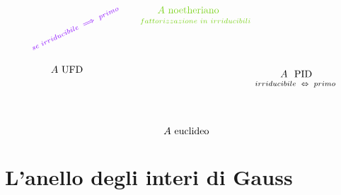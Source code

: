 \begin{equation*}
\begin{tikzpicture}[x=0.75pt,y=0.75pt,yscale=-1,xscale=1]
\draw (273.6,34.4) node [anchor=north west][inner sep=0.75pt]  [color={rgb, 255:red, 126; green, 211; blue, 33 }  ,opacity=1 ] [align=left] {$\displaystyle A$ {noetheriano}};
\draw (439,121) node [anchor=north west][inner sep=0.75pt]   [align=left] {$\displaystyle A\ $ {PID}};
\draw (130,115) node [anchor=north west][inner sep=0.75pt]   [align=left] {$\displaystyle A$ {UFD}};
\draw (282,198) node [anchor=north west][inner sep=0.75pt]   [align=left] {$\displaystyle A$ {euclideo}};
\draw (405,135.4) node [anchor=north west][inner sep=0.75pt]  [font=\scriptsize]  {$irriducibile\ \Leftrightarrow \ primo$};
\draw (102.65,88.7) node [anchor=north west][inner sep=0.75pt]  [font=\scriptsize,color={rgb, 255:red, 74; green, 144; blue, 226 }  ,opacity=1 ,rotate=-334.88]  {$\textcolor[rgb]{0.56,0.07,1}{se\ irriducibile\ \Longrightarrow \ primo}$};
\draw (250.2,50.6) node [anchor=north west][inner sep=0.75pt]  [font=\scriptsize,color={rgb, 255:red, 126; green, 211; blue, 33 }  ,opacity=1 ]  {$fattorizzazione\ in\ irriducibili$};
\end{tikzpicture}
\end{equation*}



\section{L'anello degli interi di Gauss}
